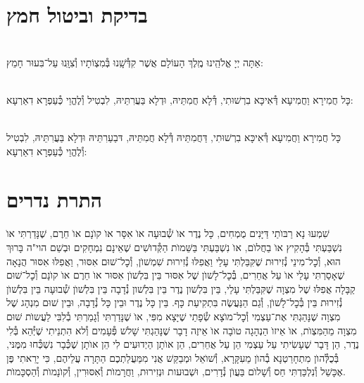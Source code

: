 \documentclass[twoside, openany, parskip=half, 11pt]{book}
\begin{document}
\chapter[בדיקת וביטול חמץ]{ בדיקת וביטול חמץ }

\\
אַתָּה יְיָ אֱלֹהֵֽינוּ מֶֽלֶךְ הָעוֹלָם אֲשֶׁר קִדְּ֯שָֽׁנוּ בְּ֯מִצְוֹתָיו וְ֯צִוָּֽנוּ עַל־בִּעוּר חָמֵץ:


\\
כָּל חֲמִירָא וַחֲמִיעָא דְּ֯אִיכָּא בִרְשׁוּתִי, דְּ֯לָא חֲמִתֵּיהּ, וּדְלָא בַּעֲרִתֵּיהּ, לִבְטִיל וְ֯לֶהֱוֵי כְּ֯עַפְרָא דִאַרְעָא:


\\
כָּל חֲמִירָא וַחֲמִיעָא דְּ֯אִיכָּא בִרְשׁוּתִי, דַּחֲמִתֵּיהּ דְּ֯לָא חֲמִתֵּיהּ, דּבַעַרִתֵּיהּ וּדְלָא בַּעֲרִתֵּיהּ, לִבְטִיל וְ֯לֶהֱוֵי כְּ֯עַפְרָא דִאַרְעָא:



\chapter[התרת נדרים]{ התרת נדרים }


שִׁמְעוּ נָא רַבּוׂתַי דַּיָּנִים מֻמְחִים, כָּל נֶדֶר אוׂ שְׁ֯בוּעָה אוׂ אִסָּר אוׂ קוׂנָם אוׂ חֵרֶם, שֶׁנָּדַרְתִּי אוׂ נִשְׁבַּעְתִּי בְּ֯הָקִיץ אוׂ בַחֲלוׂם, אוׂ נִשְׁבַּעְתִּי בַּשֵּׁמוׂת הַקְּ֯דוׂשִׁים שֶׁאֵינָם נִמְחָקִים וּבְשֵׁם הוי"ה בָּרוּךְ הוּא, וְ֯כׇל־מִינֵי נְ֯זִירוּת שֶׁקִּבַּלְתִּי עָלַי וַאֲפִלּוּ נְ֯זִירוּת שִׁמְשׁוׂן, וְ֯כׇל־שׁוּם אִסּוּר, וַאֲפִלּוּ אִסּוּר הֲנָאָה שֶׁאָסַרְתִּי עָלַי אוׂ עַל אֲחֵרִים, בְּ֯כׇל־לָשׁוׂן שֶׁל אִסּוּר בֵּין בִּלְשׁוׂן אִסּוּר אוׂ חֵרֶם אוׂ קוׂנָם וְ֯כׇל־שׁוּם קַבָּלָה אֲפִלּוּ שֶׁל מִצְוָה שֶׁקִּבַּלְתִּי עָלַי, בֵּין בִּלְשׁון נֶדֶר בֵּין בִּלְשׁון נְ֯דָבָה בֵּין בִּלְשׁוׂן שְׁ֯בוּעָה בֵּין בִּלְשׁוׂן נְ֯זִירוּת בֵּין בְּ֯כׇל־לָשׁוׂן, וְ֯גַם הַנַּעֲשֶׂה בִּתְקִיעַת כָּף. בֵּין כָּל נֶדֶר וּבֵין כָּל נְ֯דָבָה, וּבֵין שׁוּם מִנְהָג שֶׁל מִצְוָה שֶׁנָּהַגְתִּי אֶת־עַצְמִי וְ֯כׇל־מוׂצָא שְׂ֯פָתַי שֶׁיָּצָא מִפִּי, אוׂ שֶׁנָּדַרְתִּי וְ֯גָמַרְתִּי בְ֯לִבִּי לַעֲשוׂת שׁוּם מִצְוָה מֵהַמִּצְוׂת, אוׂ אֵיזוׂ הַנְהָגָה טוׂבָה אוׂ אֵיזֶה דָבָר שֶׁנָּהַגְתִּי שָׁלשׁ פְּ֯עָמִים וְ֯לא הִתְנֵיתִי שֶׁיְּ֯הֵא בְּ֯לִי נֶדֶר, הֵן דָּבָר שֶׁעָשִׂיתִי עַל עַצְמִי הֵן עַל אֲחֵרִים, הֵן אוׂתָן הַיְדוּעִים לִי הֵן אוׂתָן שֶׁכְּ֯בָר נִשְׁכְּ֯חוּ מִמֶּנּי, בְּ֯כֻלְּ֯הוׂן מִתְחָרַטְנָא בְ֯הוׂן מֵעִקָּרָא, וְ֯שׁוׂאֵל וּמְבַקֵּשׁ אֲנִי מִמַּעֲלַתְכֶם הַתָּרָה עֲלֵיהֶם, כִּי יָרֵאתִי פֶּן אֶכָּשֵׁל וְ֯נִלְכַּדְתִּי חַס וְ֯שָׁלוׂם בַּעֲוׂן נְ֯דָרִים, וּשְׁבוּעות וּנְזִירוּת, וַחֲרָמוׂת וְ֯אִסּוּרִין, וְ֯קוׂנָמוׂת וְ֯הַסְכָּמוׂת.
\end{document}
